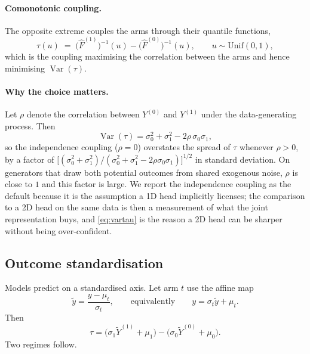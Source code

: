 \paragraph{Comonotonic coupling.}
The opposite extreme couples the arms through their quantile functions,
\begin{equation}
  \tau(u) \;=\; \bigl(\hat F^{(1)}\bigr)^{-1}(u) - \bigl(\hat F^{(0)}\bigr)^{-1}(u),
  \qquad u \sim \mathrm{Unif}(0,1),
\end{equation}
which is the coupling maximising the correlation between the arms and hence
minimising $\operatorname{Var}(\tau)$.

\paragraph{Why the choice matters.}
Let $\rho$ denote the correlation between $Y^{(0)}$ and $Y^{(1)}$ under the
data-generating process. Then
\begin{equation}
  \operatorname{Var}(\tau)
  = \sigma_0^2 + \sigma_1^2 - 2\rho\,\sigma_0\sigma_1 ,
  \label{eq:vartau}
\end{equation}
so the independence coupling ($\rho = 0$) overstates the spread of $\tau$
whenever $\rho > 0$, by a factor of
$\bigl[(\sigma_0^2+\sigma_1^2)/(\sigma_0^2+\sigma_1^2-2\rho\sigma_0\sigma_1)\bigr]^{1/2}$
in standard deviation. On generators that draw both potential outcomes from
shared exogenous noise, $\rho$ is close to $1$ and this factor is large. We
report the independence coupling as the default because it is the assumption
a 1D head implicitly licenses; the comparison to a 2D head on the same data
is then a measurement of what the joint representation buys, and
\eqref{eq:vartau} is the reason a 2D head can be sharper without being
over-confident.

\subsection{Outcome standardisation}
\label{app:standardisation}

Models predict on a standardised axis. Let arm $t$ use the affine map
\begin{equation}
  \widetilde{y} = \frac{y - \mu_t}{\sigma_t},
  \qquad\text{equivalently}\qquad
  y = \sigma_t \widetilde{y} + \mu_t .
\end{equation}
Then
\begin{equation}
  \tau
  = \bigl(\sigma_1 \widetilde{Y}^{(1)} + \mu_1\bigr)
  - \bigl(\sigma_0 \widetilde{Y}^{(0)} + \mu_0\bigr) .
  \label{eq:perarm}
\end{equation}
Two regimes follow.

